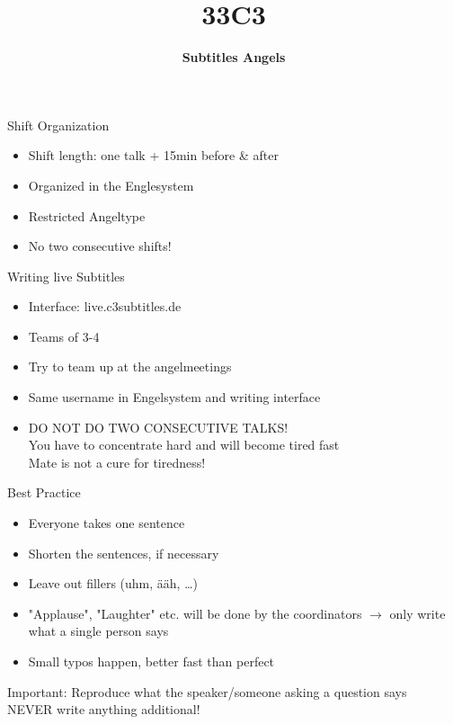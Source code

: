 \documentclass[utf8,widescreen]{beamer}
\title{\Huge \textbf{33C3}}
\subtitle{\Large \textbf{Subtitles Angels}}
\date{}
\begin{document}
\begin{frame}{\titlepage}
\end{frame}

\begin{frame}{Shift Organization}
\pause
\begin{block}{}
\begin{itemize}\itemsep 14pt
\item{Shift length: one talk + 15min before \& after}
\pause
\item{Organized in the Englesystem}
\pause
\item{Restricted Angeltype}
\pause
\item{No two consecutive shifts!}
\end{itemize}
\end{block}
\end{frame}

\begin{frame}{Writing live Subtitles}
\pause
\begin{block}{}
\begin{itemize}\itemsep 10pt
\item{Interface: live.c3subtitles.de}
\pause
\item{Teams of 3-4}
\pause
\item{Try to team up at the angelmeetings}
\pause
\item{Same username in Engelsystem and writing interface}
\pause
\item{\large DO NOT DO TWO CONSECUTIVE TALKS!\\
\normalsize You have to concentrate hard and will become tired fast\\
Mate is not a cure for tiredness!}
\end{itemize}
\end{block}
\end{frame}

\begin{frame}{Best Practice}
\pause
\begin{block}{}
\begin{itemize}\itemsep 10pt
\item{Everyone takes one sentence}
\pause
\item{Shorten the sentences, if necessary}
\pause
\item{Leave out fillers (uhm, ääh, \dots)}
\pause
\item{"Applause", "Laughter" etc. will be done by the coordinators $\rightarrow$ only write what a single person says}
\pause
\item{Small typos happen, better fast than perfect}
\end{itemize}
\pause
\end{block}
\begin{block}{Important:}
Reproduce what the speaker/someone asking a question says\\
NEVER write anything additional!
\end{block}
\end{frame}
\end{document}

